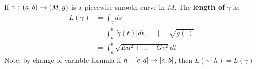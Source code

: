     \begin{ddef}
        If $\gamma :\, (a,b) \to (M,g)$ is a piecewise smooth curve in $M$. The \textbf{length of }$\gamma$ is:
        \begin{align*}
            L(\gamma) &= \int_\gamma ds\\
                      &= \int_a^b|\dot \gamma(t)|dt, \quad |\ |= \sqrt{g(\ )}\\
                      &= \int_a^b \sqrt{Eu^2 + \ldots + Gv^2}dt
        \end{align*}
        Note: by change of variable formula if $h:\, [c,d] \to [a,b]$, then $L(\gamma\cdot h) = L(\gamma)$
    \end{ddef}
